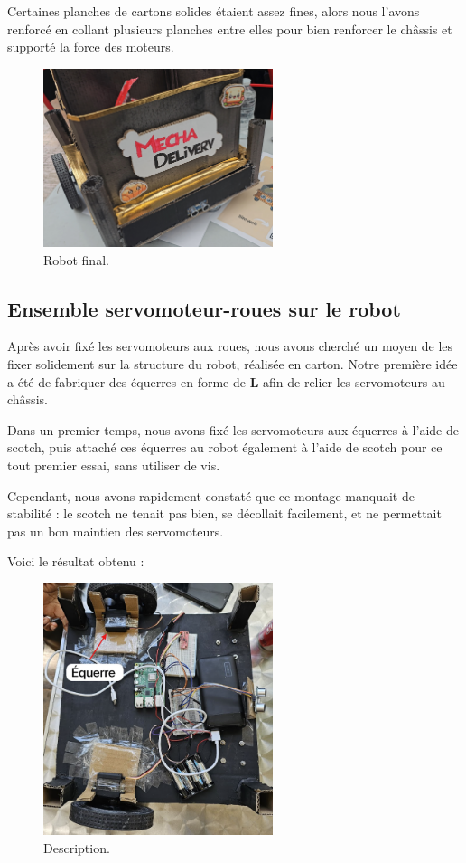 \documentclass[a4paper,12pt]{report}  %
\begin{document}
Certaines planches de cartons solides étaient assez fines, alors nous l’avons renforcé en collant plusieurs planches entre elles pour bien renforcer le châssis et supporté la force des moteurs.

\begin{figure}[H]
	\centering
	\includegraphics[width=0.6\textwidth]{./attachments/robot_final_1.png}
	\caption{Robot final.}
\end{figure}


\subsection{Ensemble servomoteur-roues sur le robot}
Après avoir fixé les servomoteurs aux roues, nous avons cherché un moyen de les fixer solidement sur la structure du robot, réalisée en carton. Notre première idée a été de fabriquer des équerres en forme de \textbf{L} afin de relier les servomoteurs au châssis.

Dans un premier temps, nous avons fixé les servomoteurs aux équerres à l’aide de scotch, puis attaché ces équerres au robot également à l’aide de scotch pour ce tout premier essai, sans utiliser de vis.

Cependant, nous avons rapidement constaté que ce montage manquait de stabilité : le scotch ne tenait pas bien, se décollait facilement, et ne permettait pas un bon maintien des servomoteurs.

Voici le résultat obtenu :
\begin{figure}[H]
	\centering
	\includegraphics[width=0.6\textwidth]{./attachments/servomoteur-roues.png}
	\caption{Description.}
\end{figure}
\end{document}
